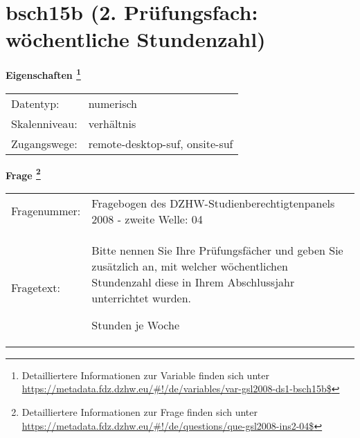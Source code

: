 
    \setcounter{footnote}{0}

    \vspace*{-1.8cm}
	\section{bsch15b (2. Prüfungsfach: wöchentliche Stundenzahl)}
	\label{section:bsch15b}



    \vspace*{0.5cm}
    \noindent\textbf{Eigenschaften
	\footnote{Detailliertere Informationen zur Variable finden sich unter
		\url{https://metadata.fdz.dzhw.eu/\#!/de/variables/var-gsl2008-ds1-bsch15b$}}}\\
	\begin{tabularx}{\hsize}{@{}lX}
	Datentyp: & numerisch \\
	Skalenniveau: & verhältnis \\
	Zugangswege: &
	  remote-desktop-suf, 
	  onsite-suf
 \\
    \end{tabularx}



				\vspace*{0.5cm}
                \noindent\textbf{Frage
	                \footnote{Detailliertere Informationen zur Frage finden sich unter
		              \url{https://metadata.fdz.dzhw.eu/\#!/de/questions/que-gsl2008-ins2-04$}}}\\
				\begin{tabularx}{\hsize}{@{}lX}
					Fragenummer: &
					  Fragebogen des DZHW-Studienberechtigtenpanels 2008 - zweite Welle:
					  04
 \\
					Fragetext: & Bitte nennen Sie Ihre Prüfungsfächer und geben Sie zusätzlich an, mit welcher wöchentlichen Stundenzahl diese in Ihrem Abschlussjahr unterrichtet wurden.\par  Stunden je Woche \\
				\end{tabularx}





